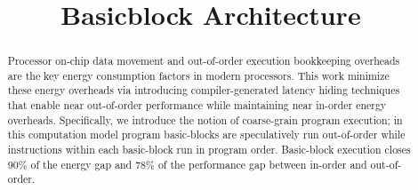 \documentclass[pageno]{jpaper}
\begin{document}
\title{
Basicblock Architecture}

\date{}
\maketitle


\begin{abstract}
Processor on-chip data movement and out-of-order execution bookkeeping overheads
are the key energy consumption factors in modern processors. This work minimize
these energy overheads via introducing compiler-generated latency hiding
techniques that enable near out-of-order performance while maintaining near
in-order energy overheads. Specifically, we introduce the notion of coarse-grain
program execution; in this computation model program basic-blocks are
speculatively run out-of-order while instructions within each basic-block run in
program order. Basic-block execution closes 90\% of the energy gap and 78\% of the
performance gap between in-order and out-of-order.
\end{abstract}


%




%



\end{document}
